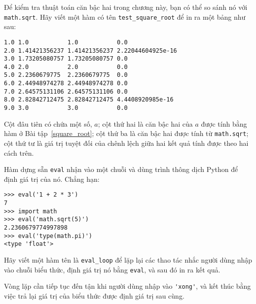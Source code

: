 \documentclass[11pt]{book}
\begin{document}
\begin{ex}


Để kiểm tra thuật toán căn bậc hai trong chương này, bạn có thể so sánh
nó với {\tt math.sqrt}.  Hãy viết một hàm có tên \verb"test_square_root"
để in ra một bảng như sau:

\beforeverb
\begin{verbatim}
1.0 1.0           1.0           0.0
2.0 1.41421356237 1.41421356237 2.22044604925e-16
3.0 1.73205080757 1.73205080757 0.0
4.0 2.0           2.0           0.0
5.0 2.2360679775  2.2360679775  0.0
6.0 2.44948974278 2.44948974278 0.0
7.0 2.64575131106 2.64575131106 0.0
8.0 2.82842712475 2.82842712475 4.4408920985e-16
9.0 3.0           3.0           0.0

\end{verbatim}
\afterverb
%
Cột đâu tiên có chứa một số, $a$; cột thứ hai là căn bậc
hai của $a$ được tính bằng hàm ở Bài tập~\ref{square_root}; 
cột thứ ba là căn bậc hai được tính từ
{\tt math.sqrt}; cột thứ tư là giá trị tuyệt đối của chênh lệch giữa
hai kết quả tính được theo hai cách trên.
\end{ex}


\begin{ex}


Hàm dựng sẵn {\tt eval} nhận vào một chuỗi và dùng trình thông
dịch Python để định giá trị của nó. Chẳng hạn:

\beforeverb
\begin{verbatim}
>>> eval('1 + 2 * 3')
7
>>> import math
>>> eval('math.sqrt(5)')
2.2360679774997898
>>> eval('type(math.pi)')
<type 'float'>
\end{verbatim}
\afterverb
%
Hãy viết một hàm tên là \verb"eval_loop" để lặp lại các thao tác
nhắc người dùng nhập vào chuỗi biểu thức, định giá trị nó
bằng {\tt eval}, và sau đó in ra kết quả.

Vòng lặp cần tiếp tục đến tận khi người dùng nhập vào \verb"'xong'", 
và kết thúc bằng việc trả lại giá trị của biểu thức được định giá trị
sau cùng.
\end{ex}
\end{document}

